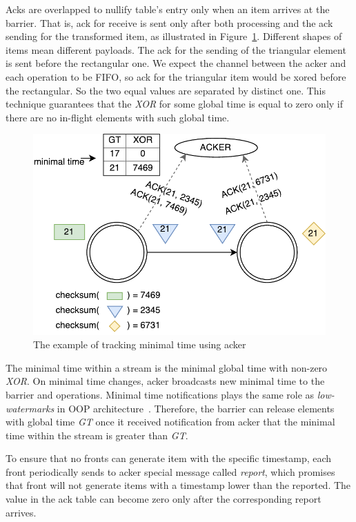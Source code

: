 Acks are overlapped to nullify table's entry only when an item arrives at the barrier. That is, ack for receive is sent only after both processing and the ack sending for the transformed item, as illustrated in Figure~\ref{acker}. Different shapes of items mean different payloads. The ack for the sending of the triangular element is sent before the rectangular one. We expect the channel between the acker and each operation to be FIFO, so ack for the triangular item would be xored before the rectangular. So the two equal values are separated by distinct one. This technique guarantees that the {\it XOR} for some global time is equal to zero only if there are no in-flight elements with such global time.

\begin{figure}[htbp]
  \centering
  \includegraphics[scale=0.58]{pics/acker}
  \caption{The example of tracking minimal time using acker}
  \label {acker}
\end{figure}

The minimal time within a stream is the minimal global time with non-zero {\it XOR}. On minimal time changes, acker broadcasts new minimal time to the barrier and operations. Minimal time notifications plays the same role as {\em low-watermarks} in OOP architecture~\cite{Li:2008:OPN:1453856.1453890}. Therefore, the barrier can release elements with global time {\it GT} once it received notification from acker that the minimal time within the stream is greater than {\it GT}.

To ensure that no fronts can generate item with the specific timestamp, each front periodically sends to acker special message called {\it report}, which promises that front will not generate items with a timestamp lower than the reported. The value in the ack table can become zero only after the corresponding report arrives.

